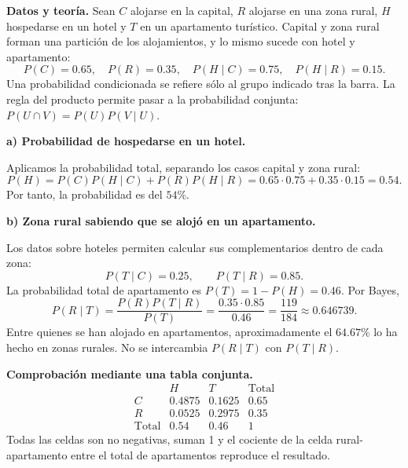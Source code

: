 \textbf{Datos y teoría.} Sean $C$ alojarse en la capital, $R$ alojarse en una zona rural, $H$ hospedarse en un hotel y $T$ en un apartamento turístico. Capital y zona rural forman una partición de los alojamientos, y lo mismo sucede con hotel y apartamento:
\[
P(C)=0.65,\quad P(R)=0.35,\quad P(H\mid C)=0.75,\quad P(H\mid R)=0.15.
\]
Una probabilidad condicionada se refiere sólo al grupo indicado tras la barra. La regla del producto permite pasar a la probabilidad conjunta: $P(U\cap V)=P(U)P(V\mid U)$.

\textbf{a) Probabilidad de hospedarse en un hotel.}\par\nopagebreak[4]

Aplicamos la probabilidad total, separando los casos capital y zona rural:
\[
P(H)=P(C)P(H\mid C)+P(R)P(H\mid R)
=0.65\cdot0.75+0.35\cdot0.15=\boxed{0.54}.
\]
Por tanto, la probabilidad es del $54\%$.

\textbf{b) Zona rural sabiendo que se alojó en un apartamento.}\par\nopagebreak[4]

Los datos sobre hoteles permiten calcular sus complementarios dentro de cada zona:
\[
P(T\mid C)=0.25,\qquad P(T\mid R)=0.85.
\]
La probabilidad total de apartamento es $P(T)=1-P(H)=0.46$. Por Bayes,
\[
P(R\mid T)=\frac{P(R)P(T\mid R)}{P(T)}
=\frac{0.35\cdot0.85}{0.46}
=\boxed{\frac{119}{184}\approx0.646739}.
\]
Entre quienes se han alojado en apartamentos, aproximadamente el $64.67\%$ lo ha hecho en zonas rurales. No se intercambia $P(R\mid T)$ con $P(T\mid R)$.

\textbf{Comprobación mediante una tabla conjunta.}
\[
\begin{array}{c|cc|c}
&H&T&\text{Total}\\\hline
C&0.4875&0.1625&0.65\\
R&0.0525&0.2975&0.35\\\hline
\text{Total}&0.54&0.46&1
\end{array}
\]
Todas las celdas son no negativas, suman 1 y el cociente de la celda rural-apartamento entre el total de apartamentos reproduce el resultado.
